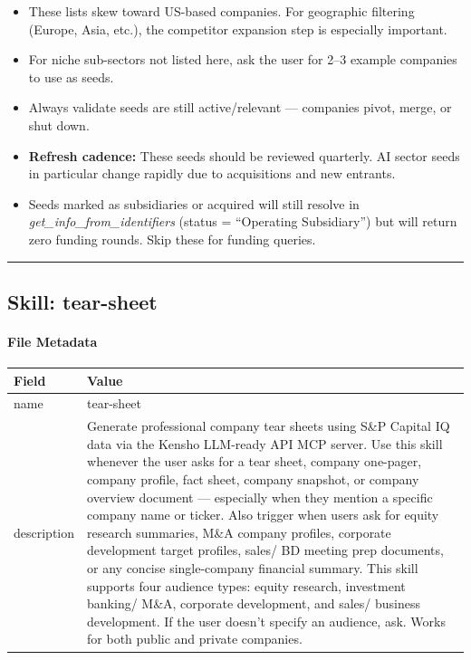 \documentclass[11pt]{article}
\begin{document}
\begin{itemize}[leftmargin=*,itemsep=2pt,topsep=2pt]
\item {} These lists skew toward US-based companies. For geographic filtering (Europe, Asia, etc.), the competitor expansion step is especially important.
\item {} For niche sub-sectors not listed here, ask the user for 2–3 example companies to use as seeds.
\item {} Always validate seeds are still active/relevant — companies pivot, merge, or shut down.
\item {} \textbf{Refresh cadence:} These seeds should be reviewed quarterly. AI sector seeds in particular change rapidly due to acquisitions and new entrants.
\item {} Seeds marked as subsidiaries or acquired will still resolve in \emph{get\_\allowbreak{}info\_\allowbreak{}from\_\allowbreak{}identifiers} (status = ``Operating Subsidiary'') but will return zero funding rounds. Skip these for funding queries.
\end{itemize}

\vspace{0.8em}\hrule\vspace{0.8em}

\subsection{Skill: tear-sheet}\label{file:spglobal-skills-tear-sheet-SKILL.md}

\paragraph{File Metadata}\mbox{}\par
\begingroup
\small
\setlength{\tabcolsep}{2pt}
\begin{longtable}{>{\RaggedRight\arraybackslash\hspace{0pt}}p{}>{\RaggedRight\arraybackslash\hspace{0pt}}p{}}
\toprule
{} \textbf{Field} & \textbf{Value} \\
\midrule
{} name & tear-sheet \\
{} description & Generate professional company tear sheets using S\&P Capital IQ data via the Kensho LLM-ready API MCP server. Use this skill whenever the user asks for a tear sheet, company one-pager, company profile, fact sheet, company snapshot, or company overview document — especially when they mention a specific company name or ticker. Also trigger when users ask for equity research summaries, M\&A company profiles, corporate development target profiles, sales/ BD meeting prep documents, or any concise single-company financial summary. This skill supports four audience types: equity research, investment banking/ M\&A, corporate development, and sales/ business development. If the user doesn't specify an audience, ask. Works for both public and private companies. \\
\bottomrule
\end{longtable}
\endgroup
\end{document}
